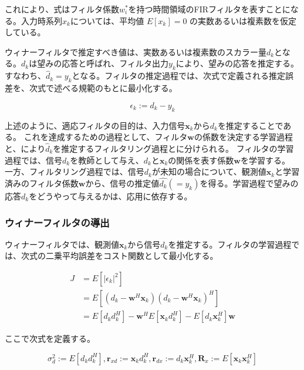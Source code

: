 これにより、式はフィルタ係数\({w_i^*}\)を持つ時間領域のFIRフィルタを表すことになる。入力時系列\({x_k}\)については、平均値
\(E[x_k]=0\) の実数あるいは複素数を仮定している。

ウィナーフィルタで推定すべき値は、実数あるいは複素数のスカラー量\(d_k\)となる。\(d_k\)は望みの応答と呼ばれ、フィルタ出力\(y_k\)により、望みの応答を推定する。すなわち、\(\hat{d}_k = y_k\)となる。フィルタの推定過程では、次式で定義される推定誤差を、次式で述べる規範のもとに最小化する。

\begin{equation}
\epsilon_k := d_k - y_k
\end{equation}

上述のように、適応フィルタの目的は、入力信号\(\bm{x}_k\)から\(d_k\)を推定することである。
これを達成するための過程として、フィルタ\(\bm{w}\)の係数を決定する学習過程と、により\(\hat{d}_k\)を推定するフィルタリング過程とに分けられる。
フィルタの学習過程では、信号\(d_k\)を教師として与え、\(d_k\)と\(\bm{x}_k\)の関係を表す係数\(\bm{w}\)を学習する。
一方、フィルタリング過程では、信号\(d_k\)が未知の場合について、観測値\(\bm{x}_k\)と学習済みのフィルタ係数\(\bm{w}\)から、信号の推定値\(\hat{d_k} (= y_k)\)を得る。学習過程で望みの応答\(d_k\)をどうやって与えるかは、応用に依存する\cite{signal_processing_for_array}。

\subsubsection{ウィナーフィルタの導出}\label{wiener-introduction}

ウィナーフィルタでは、観測値\(\bm{x}_k\)から信号\(d_k\)を推定する。フィルタの学習過程では、次式の二乗平均誤差をコスト関数として最小化する。

\begin{equation}
\begin{split}
J &= E[|\epsilon_k|^2] \\
  &= E[ (d_k - \bm{w}^H \bm{x}_k) (d_k - \bm{w}^H \bm{x}_k)^H ] \\
  &= E[ d_k d_k^H] - \bm{w}^H E[\bm{x}_k d_k^H] - E[d_k \bm{x}_k^H ] \bm{w} 
\end{split}
\label{equ:J_epsilon}
\end{equation}

ここで次式を定義する。

\begin{equation}
\sigma_d^2 := E[d_k d_k^H], \bm{r}_{xd} := \bm{x}_k d_k^H, \bm{r}_{dx} := d_k \bm{x}_k^H, \bm{R}_x := E[\bm{x}_k \bm{x}_k^H]
\end{equation}

